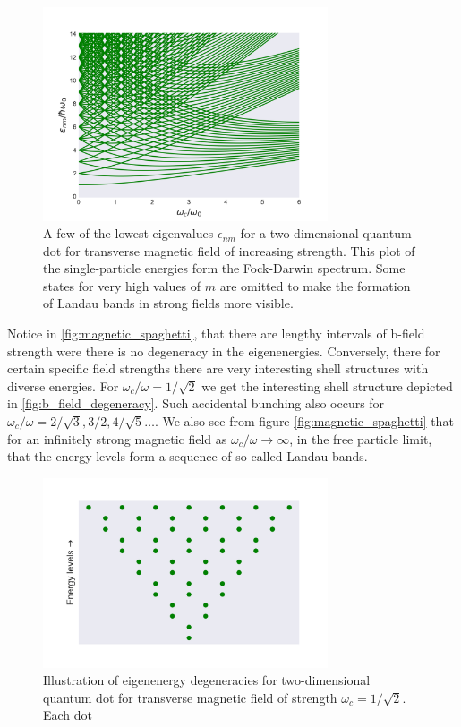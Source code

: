 \begin{figure}
    \centering
    \includegraphics[width=0.75\textwidth]{implementation/figures/spaghetti.png}
    \caption{A few of the lowest eigenvalues $\epsilon_{nm}$ for a two-dimensional 
    quantum dot for transverse magnetic field of increasing strength. This plot of 
    the single-particle energies form the Fock-Darwin spectrum. Some states for very 
    high values of $m$ are omitted to make the formation of Landau bands in strong
    fields more visible.
    \label{fig:magnetic_spaghetti}}
\end{figure}

Notice in \autoref{fig:magnetic_spaghetti}, that there are lengthy intervals of 
b-field strength were there is no degeneracy in the eigenenergies. Conversely, there 
for certain specific field strengths there are very interesting shell structures with 
diverse energies. For $\omega_c/\omega=1/\sqrt{2}$ we get the interesting shell structure
depicted in \autoref{fig:b_field_degeneracy}. Such accidental bunching also occurs 
for $\omega_c/\omega=2/\sqrt{3}, 3/2, 4/\sqrt{5}\dots$. We also see from figure 
\autoref{fig:magnetic_spaghetti} that for an infinitely strong magnetic field as 
$\omega_c/\omega \to \infty$, in the free particle limit, that the energy levels 
form a sequence of so-called Landau bands. 


\begin{figure}
    \centering
    \includegraphics[width=0.75\textwidth]{implementation/figures/omega_inv_square_root_2_degeneracy.png}
    \caption{Illustration of eigenenergy degeneracies for two-dimensional quantum 
    dot for transverse magnetic field of strength $\omega_c=1/\sqrt{2}$.
    Each dot 
    \label{fig:b_field_degeneracy}}
\end{figure}

